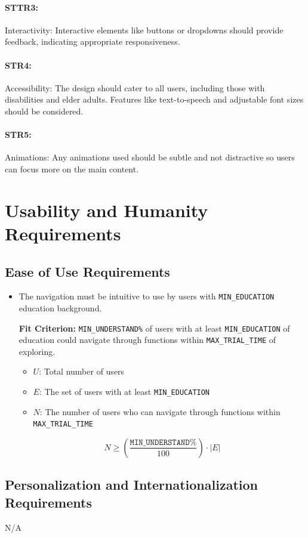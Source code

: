 \documentclass[12pt]{article}
\newcounter{uhrnum} %
\newcommand{\rtheuhrnum}{UHR\refstepcounter{uhrnum}\theuhrnum:}
\begin{document}
\paragraph{STTR3:}Interactivity: Interactive elements like buttons or dropdowns should provide feedback, indicating appropriate responsiveness.
\paragraph{STR4:}Accessibility: The design should cater to all users, including those with disabilities and elder adults. Features like text-to-speech and adjustable font sizes should be considered.
\paragraph{STR5:}Animations: Any animations used should be subtle and not distractive so users can focus more on the main content. 



\section{Usability and Humanity Requirements}
\subsection{Ease of Use Requirements}
\begin{itemize}[leftmargin=16.5mm,labelsep=4mm,label=\rtheuhrnum]
\item The navigation must be intuitive to use by users with \texttt{MIN\_EDUCATION} education background.

\textbf{Fit Criterion:} \texttt{MIN\_UNDERSTAND\%} of users with at least \texttt{MIN\_EDUCATION} of education could navigate through functions within \texttt{MAX\_TRIAL\_TIME} of exploring.

\begin{itemize}
    \item \( U \): Total number of users
    \item \( E \): The set of users with at least \texttt{MIN\_EDUCATION}
    \item \( N \): The number of users who can navigate through functions within \texttt{MAX\_TRIAL\_TIME}
\end{itemize}
\[
    N \geq \left( \frac{\texttt{MIN\_UNDERSTAND\%}}{100} \right) \cdot |E|
\]
\end{itemize}
\subsection{Personalization and Internationalization Requirements}
N/A
\end{document}
